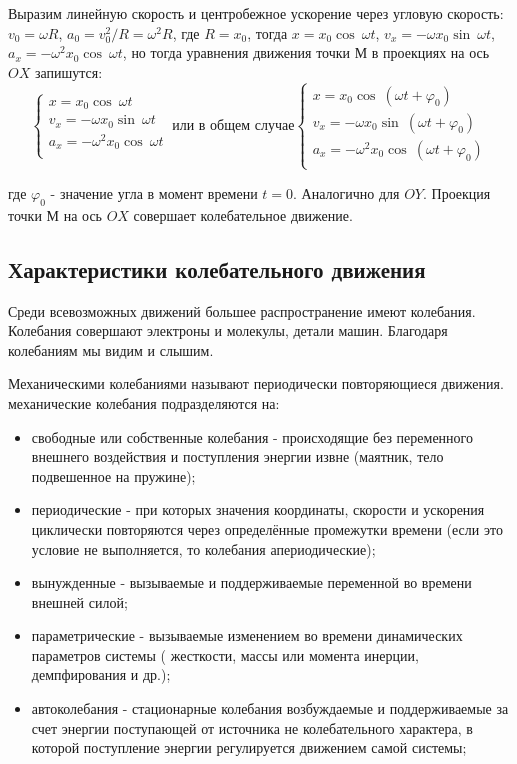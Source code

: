 \documentclass[a6paper, 11pt]{diss_4}
\renewcommand{\'}{\,'}
\begin{document}
Выразим линейную скорость и центробежное ускорение через угловую скорость:
$v_0=\omega R$, $a_0 = v_0^2/R = \omega^2R$, где  $R = x_0$, тогда  $x = x_0\cos\ \omega t$,
$v_x=-\omega x_0\sin\ \omega t$, $a_x=-\omega^2 x_0\cos\ \omega t$,  но тогда уравнения движения
точки $М$ в проекциях на ось $OX$ запишутся:
\begin{equation*}
     \left\{
          \begin{array}{lr}
x=x_0\cos\ \omega t\\
v_x=-\omega x_0\sin\ \omega t\\
a_x=-\omega^2 x_0\cos\ \omega t\\
          \end{array}
     \right.\ \text{или в общем случае}
     \left\{
          \begin{array}{lr}
x=x_0\cos\ (\omega t+\varphi_0)\\
v_x=-\omega x_0\sin\ (\omega t+\varphi_0)\\
a_x=-\omega^2 x_0\cos\ (\omega t+\varphi_0)\\
          \end{array}
     \right.
\end{equation*}

где $\varphi_0$ - значение угла в момент времени $t=0$.
Аналогично для $OY$. Проекция точки $М$ на ось $OX$ совершает колебательное движение.

\subsection{Характеристики колебательного движения}

Среди всевозможных движений большее распространение имеют колебания. Колебания совершают электроны и молекулы, детали машин. Благодаря колебаниям мы видим и слышим.

Механическими колебаниями называют периодически повторяющиеся движения. механические колебания подразделяются на:

\begin{itemize}
\item свободные или собственные колебания - происходящие без переменного внешнего воздействия и поступления энергии извне (маятник, тело подвешенное на пружине);
\item периодические - при которых значения координаты, скорости и ускорения циклически повторяются через определённые промежутки времени (если это условие не выполняется, то колебания апериодические);
\item вынужденные - вызываемые и поддерживаемые переменной во времени внешней силой;
\item параметрические - вызываемые изменением во времени динамических параметров системы ( жесткости, массы или момента инерции, демпфирования и др.);
\item автоколебания - стационарные колебания возбуждаемые и поддерживаемые за счет энергии поступающей от источника не колебательного характера, в которой поступление энергии регулируется движением самой системы;
\end{itemize}
\end{document}
